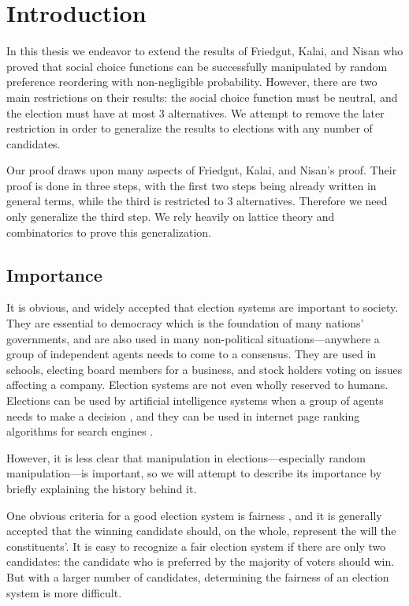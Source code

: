 

\chapter{Introduction}

	In this thesis we endeavor to extend the results of Friedgut, Kalai, and Nisan \cite{friedgut2008elections} who proved that social choice functions can be successfully manipulated by random preference reordering with non-negligible probability. However, there are two main restrictions on their results: the social choice function must be neutral, and the election must have at most 3 alternatives. We attempt to remove the later restriction in order to generalize the results to elections with any number of candidates.

	Our proof draws upon many aspects of Friedgut, Kalai, and Nisan's proof. Their proof is done in three steps, with the first two steps being already written in general terms, while the third is restricted to 3 alternatives. Therefore we need only generalize the third step. We rely heavily on lattice theory and combinatorics to prove this generalization.


\section{Importance}

	It is obvious, and widely accepted that election systems are important to society. They are essential to democracy which is the foundation of many nations' governments, and are also used in many non-political situations---anywhere a group of independent agents needs to come to a consensus. They are used in schools, electing board members for a business, and stock holders voting on issues affecting a company. Election systems are not even wholly reserved to humans. Elections can be used by artificial intelligence systems when a group of agents needs to make a decision \cite{ephrati1991clarke, ephrati1993multi, pennock2000social, dwork2001rank, fagin2003efficient}, and they can be used in internet page ranking algorithms for search engines \cite{chevaleyre2007short}.

	However, it is less clear that manipulation in elections---especially random manipulation---is important, so we will attempt to describe its importance by briefly explaining the history behind it.

	One obvious criteria for a good election system is fairness \cite{chevaleyre2006issues}, and it is generally accepted that the winning candidate should, on the whole, represent the will the constituents'. It is easy to recognize a fair election system if there are only two candidates: the candidate who is preferred by the majority of voters should win. But with a larger number of candidates, determining the fairness of an election system is more difficult.

